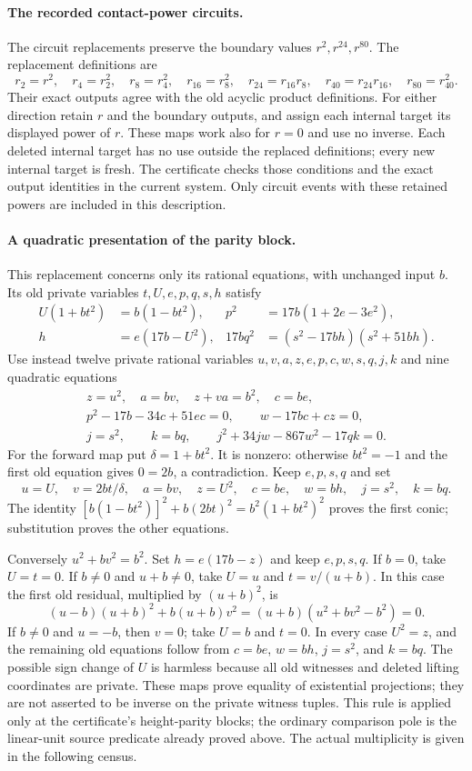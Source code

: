 \paragraph{The recorded contact-power circuits.}
The circuit replacements preserve the boundary values $r^2,r^{24},r^{80}$.
The replacement definitions are
\[
 r_2=r^2,\quad r_4=r_2^2,\quad r_8=r_4^2,\quad
 r_{16}=r_8^2,\quad r_{24}=r_{16}r_8,\quad
 r_{40}=r_{24}r_{16},\quad r_{80}=r_{40}^2.
\]
Their exact outputs agree with the old acyclic product definitions.
For either direction retain $r$ and the boundary outputs, and assign
each internal target its displayed power of $r$. These maps work also
for $r=0$ and use no inverse. Each deleted internal target has no use
outside the replaced definitions; every new internal target is fresh.
The certificate checks those conditions and the exact output identities
in the current system. Only circuit events with these retained powers
are included in this description.

\paragraph{A quadratic presentation of the parity block.}
This replacement concerns only its rational equations, with unchanged
input $b$. Its old private variables $t,U,e,p,q,s,h$ satisfy
\begin{align*}
 U(1+bt^2)&=b(1-bt^2),&
 p^2&=17b(1+2e-3e^2),\\
 h&=e(17b-U^2),&
 17bq^2&=(s^2-17bh)(s^2+51bh).
\end{align*}
Use instead twelve private rational variables
$u,v,a,z,e,p,c,w,s,q,j,k$ and nine quadratic equations
\begin{gather*}
 z=u^2,\quad a=bv,\quad z+va=b^2,\quad c=be,\\
 p^2-17b-34c+51ec=0,\qquad w-17bc+cz=0,\\
 j=s^2,\qquad k=bq,\qquad
 j^2+34jw-867w^2-17qk=0.
\end{gather*}
For the forward map put $\delta=1+bt^2$. It is nonzero: otherwise
$bt^2=-1$ and the first old equation gives $0=2b$, a contradiction.
Keep $e,p,s,q$ and set
\[
 u=U,\quad v=2bt/\delta,\quad a=bv,\quad z=U^2,\quad
 c=be,\quad w=bh,\quad j=s^2,\quad k=bq.
\]
The identity
$[b(1-bt^2)]^2+b(2bt)^2=b^2(1+bt^2)^2$ proves the first conic;
substitution proves the other equations.

Conversely $u^2+bv^2=b^2$. Set $h=e(17b-z)$ and keep $e,p,s,q$.
If $b=0$, take $U=t=0$. If $b\ne0$ and $u+b\ne0$, take
$U=u$ and $t=v/(u+b)$. In this case the first old residual, multiplied
by $(u+b)^2$, is
\[
 (u-b)(u+b)^2+b(u+b)v^2
       =(u+b)(u^2+bv^2-b^2)=0.
\]
If $b\ne0$ and $u=-b$, then $v=0$; take $U=b$ and $t=0$.
In every case $U^2=z$, and the remaining old equations follow from
$c=be$, $w=bh$, $j=s^2$, and $k=bq$. The possible sign change of $U$
is harmless because all old witnesses and deleted lifting coordinates
are private. These maps prove equality of existential projections;
they are not asserted to be inverse on the private witness tuples.
This rule is applied only at the certificate's height-parity blocks;
the ordinary comparison pole is the linear-unit source predicate already
proved above. The actual multiplicity is given in the following census.

